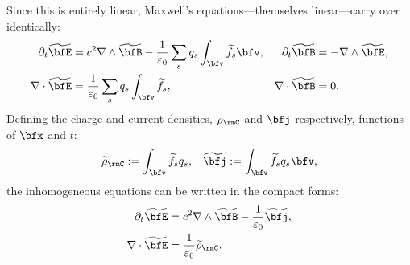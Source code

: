     Since this is entirely linear, Maxwell's equations—themselves linear—carry over identically:
    \begin{align*}
        \partial_{t}\widetilde{\bfE}  &=  c^{2}\nabla\wedge\widetilde{\bfB} - \frac{1}{\varepsilon_{0}}\sum_{s}q_{s}\int_{\bfv}\widetilde{f}_{s}\bfv,  &
        \partial_{t}\widetilde{\bfB}  &=  - \nabla\wedge\widetilde{\bfE},  \\
        \nabla\cdot\widetilde{\bfE}  &=  \frac{1}{\varepsilon_{0}}\sum_{s}q_{s}\int_{\bfv}\widetilde{f}_{s},  &
        \nabla\cdot\widetilde{\bfB}  &=  0.
    \end{align*}
    Defining the charge and current densities, $\rho_{\rmC}$ and $\bfj$ respectively, functions of $\bfx$ and $t$:
    \begin{align}
        \widetilde{\rho}_{\rmC}  :=  \int_{\bfv}\widetilde{f}_{s}q_{s},  &&
               \widetilde{\bfj}  :=  \int_{\bfv}\widetilde{f}_{s}q_{s}\bfv,
    \end{align}
    the inhomogeneous equations can be written in the compact forms:
    \begin{align*}
        \partial_{t}\widetilde{\bfE}  &=  c^{2}\nabla\wedge\widetilde{\bfB} - \frac{1}{\varepsilon_{0}}\widetilde{\bfj},  \\
        \nabla\cdot\widetilde{\bfE}  &=  \frac{1}{\varepsilon_{0}}\widetilde{\rho}_{\rmC}.
    \end{align*}
    
